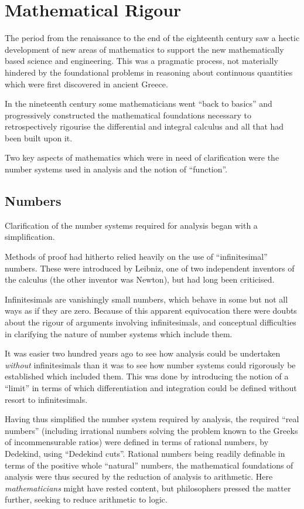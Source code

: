 \section{Mathematical Rigour}

The period from the renaissance to the end of the eighteenth century saw a hectic development of new areas of mathematics to support the new mathematically based science and engineering.
This was a pragmatic process, not materially hindered by the foundational problems in reasoning about continuous quantities which were first discovered in ancient Greece.

In the nineteenth century some mathematicians went ``back to basics'' and progressively constructed the mathematical foundations necessary to retrospectively rigourise the differential and integral calculus and all that had been built upon it.

Two key aspects of mathematics which were in need of clarification were the number systems used in analysis and the notion of ``function''.

\subsection{Numbers}

Clarification of the number systems required for analysis began with a simplification.

Methods of proof had hitherto relied heavily on the use of ``infinitesimal'' numbers.
These were introduced by Leibniz, one of two independent inventors of the calculus (the other inventor was Newton), but had long been criticised.

Infinitesimals are vanishingly small numbers, which behave in some but not all ways as if they are zero.
Because of this apparent equivocation there were doubts about the rigour of arguments involving infinitesimals, and conceptual difficulties in clarifying the nature of number systems which include them.

It was easier two hundred years ago to see how analysis could be undertaken {\it without} infinitesimals than it was to see how number systems could rigorously be established which included them.
This was done by introducing the notion of a ``limit'' in terms of which differentiation and integration could be defined without resort to infinitesimals.

Having thus simplified the number system required by analysis, the required ``real numbers'' (including irrational numbers solving the problem known to the Greeks of incommensurable ratios) were defined in terms of rational numbers, by Dedekind, using ``Dedekind cuts''.
Rational numbers being readily definable in terms of the positive whole ``natural'' numbers, the mathematical foundations of analysis were thus secured by the reduction of analysis to arithmetic.
Here {\it mathematicians} might have rested content, but philosophers pressed the matter further, seeking to reduce arithmetic to logic.

